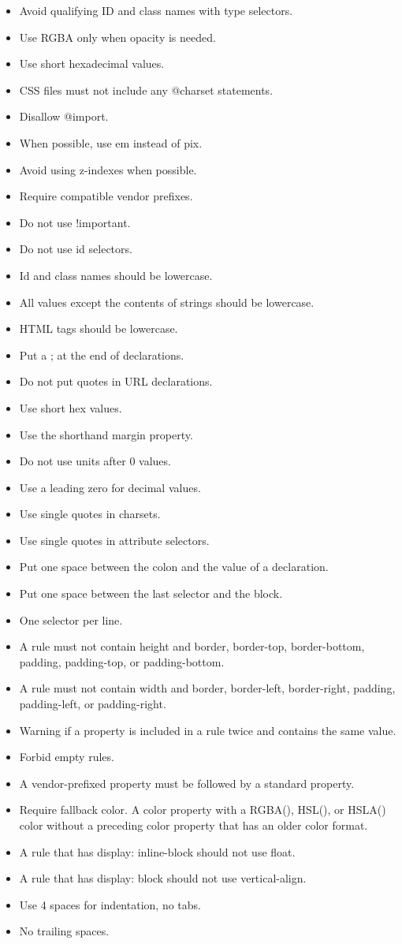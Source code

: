 \documentclass[parskip=full]{uvamscse}
\begin{document}
\begin{itemize} 
\item Avoid qualifying ID and class names with type selectors. 
\item Use RGBA only when opacity is needed.
\item Use short hexadecimal values. 
\item CSS files must not include any @charset statements.
\item Disallow @import. 
\item When possible, use em instead of pix. 
\item Avoid using z-indexes when possible. 
\item Require compatible vendor prefixes. 
\item Do not use !important. 
\item Do not use id selectors. 
\item Id and class names should be lowercase.
\item All values except the contents of strings should be lowercase.  
\item HTML tags should be lowercase.
\item Put a ; at the end of declarations. 
\item Do not put quotes in URL declarations.
\item Use short hex values.
\item Use the shorthand margin property.
\item Do not use units after 0 values.
\item Use a leading zero for decimal values.
\item Use single quotes in charsets.
\item Use single quotes in attribute selectors.
\item Put one space between the colon and the value of a declaration.
\item Put one space between the last selector and the block.
\item One selector per line.
\item A rule must not contain height and border, border-top, border-bottom, padding, padding-top, or padding-bottom.
\item A rule must not contain width and border, border-left, border-right, padding, padding-left, or padding-right.
\item Warning if a property is included in a rule twice and contains the same value.
\item Forbid empty rules.
\item A vendor-prefixed property must be followed by a standard property.
\item Require fallback color. A color property with a RGBA(), HSL(), or HSLA() color without a preceding color property that has an older color format.
\item A rule that has display: inline-block should not use float.
\item A rule that has display: block should not use vertical-align.
\item Use 4 spaces for indentation, no tabs.
\item No trailing spaces.
\end{itemize}
\end{document}
